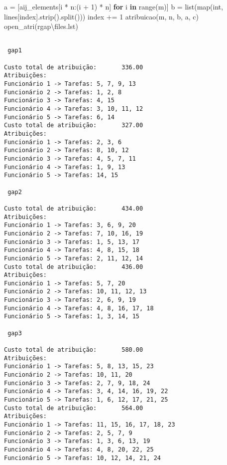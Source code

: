 \documentclass[
  letterpaper,
  DIV=11,
  numbers=noendperiod]{scrartcl}
\newenvironment{Shaded}{\begin{snugshade}}{\end{snugshade}}
\newcommand{\BuiltInTok}[1]{\textcolor[rgb]{0.00,0.23,0.31}{#1}}
\newcommand{\ControlFlowTok}[1]{\textcolor[rgb]{0.00,0.23,0.31}{\textbf{#1}}}
\newcommand{\DecValTok}[1]{\textcolor[rgb]{0.68,0.00,0.00}{#1}}
\newcommand{\KeywordTok}[1]{\textcolor[rgb]{0.00,0.23,0.31}{\textbf{#1}}}
\newcommand{\NormalTok}[1]{\textcolor[rgb]{0.00,0.23,0.31}{#1}}
\newcommand{\OperatorTok}[1]{\textcolor[rgb]{0.37,0.37,0.37}{#1}}
\newcommand{\VerbatimStringTok}[1]{\textcolor[rgb]{0.13,0.47,0.30}{#1}}
\begin{document}
\begin{Shaded}
\begin{Highlighting}[]
\NormalTok{            a }\OperatorTok{=}\NormalTok{ [aij\_elements[i }\OperatorTok{*}\NormalTok{ n:(i }\OperatorTok{+} \DecValTok{1}\NormalTok{) }\OperatorTok{*}\NormalTok{ n] }\ControlFlowTok{for}\NormalTok{ i }\KeywordTok{in} \BuiltInTok{range}\NormalTok{(m)]}
\NormalTok{            b }\OperatorTok{=} \BuiltInTok{list}\NormalTok{(}\BuiltInTok{map}\NormalTok{(}\BuiltInTok{int}\NormalTok{, lines[index].strip().split()))}
\NormalTok{            index }\OperatorTok{+=} \DecValTok{1}
\NormalTok{            atribuicao(m, n, b, a, c)}
\NormalTok{open\_atri(}\VerbatimStringTok{r\textquotesingle{}gap\textbackslash{}files.lst\textquotesingle{}}\NormalTok{)}
\end{Highlighting}
\end{Shaded}

\begin{verbatim}

 gap1

Custo total de atribuição:       336.00
Atribuições:
Funcionário 1 -> Tarefas: 5, 7, 9, 13
Funcionário 2 -> Tarefas: 1, 2, 8
Funcionário 3 -> Tarefas: 4, 15
Funcionário 4 -> Tarefas: 3, 10, 11, 12
Funcionário 5 -> Tarefas: 6, 14
Custo total de atribuição:       327.00
Atribuições:
Funcionário 1 -> Tarefas: 2, 3, 6
Funcionário 2 -> Tarefas: 8, 10, 12
Funcionário 3 -> Tarefas: 4, 5, 7, 11
Funcionário 4 -> Tarefas: 1, 9, 13
Funcionário 5 -> Tarefas: 14, 15

 gap2

Custo total de atribuição:       434.00
Atribuições:
Funcionário 1 -> Tarefas: 3, 6, 9, 20
Funcionário 2 -> Tarefas: 7, 10, 16, 19
Funcionário 3 -> Tarefas: 1, 5, 13, 17
Funcionário 4 -> Tarefas: 4, 8, 15, 18
Funcionário 5 -> Tarefas: 2, 11, 12, 14
Custo total de atribuição:       436.00
Atribuições:
Funcionário 1 -> Tarefas: 5, 7, 20
Funcionário 2 -> Tarefas: 10, 11, 12, 13
Funcionário 3 -> Tarefas: 2, 6, 9, 19
Funcionário 4 -> Tarefas: 4, 8, 16, 17, 18
Funcionário 5 -> Tarefas: 1, 3, 14, 15

 gap3

Custo total de atribuição:       580.00
Atribuições:
Funcionário 1 -> Tarefas: 5, 8, 13, 15, 23
Funcionário 2 -> Tarefas: 10, 11, 20
Funcionário 3 -> Tarefas: 2, 7, 9, 18, 24
Funcionário 4 -> Tarefas: 3, 4, 14, 16, 19, 22
Funcionário 5 -> Tarefas: 1, 6, 12, 17, 21, 25
Custo total de atribuição:       564.00
Atribuições:
Funcionário 1 -> Tarefas: 11, 15, 16, 17, 18, 23
Funcionário 2 -> Tarefas: 2, 5, 7, 9
Funcionário 3 -> Tarefas: 1, 3, 6, 13, 19
Funcionário 4 -> Tarefas: 4, 8, 20, 22, 25
Funcionário 5 -> Tarefas: 10, 12, 14, 21, 24


\end{verbatim}
\end{document}
